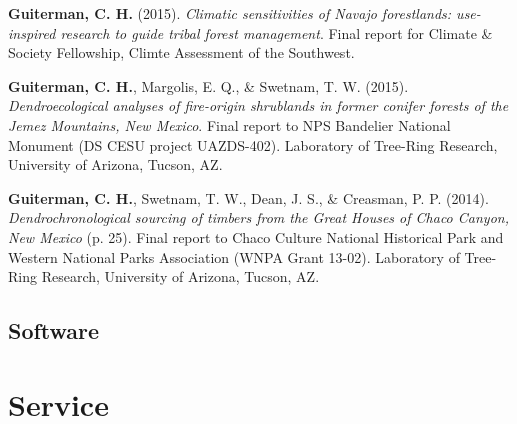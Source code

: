 \documentclass[11pt,a4paper,]{moderncv}
\begin{document}
\leavevmode\hypertarget{ref-NavajoClimateSensitivity}{}%
\textbf{Guiterman, C. H.} (2015). \emph{Climatic sensitivities of Navajo
forestlands: use-inspired research to guide tribal forest management}.
Final report for Climate \& Society Fellowship, Climte Assessment of the
Southwest.

\leavevmode\hypertarget{ref-Shrubfields}{}%
\textbf{Guiterman, C. H.}, Margolis, E. Q., \& Swetnam, T. W. (2015).
\emph{Dendroecological analyses of fire-origin shrublands in former
conifer forests of the Jemez Mountains, New Mexico}. Final report to NPS
Bandelier National Monument (DS CESU project UAZDS-402). Laboratory of
Tree-Ring Research, University of Arizona, Tucson, AZ.

\leavevmode\hypertarget{ref-ChacoReport}{}%
\textbf{Guiterman, C. H.}, Swetnam, T. W., Dean, J. S., \& Creasman, P.
P. (2014). \emph{Dendrochronological sourcing of timbers from the Great
Houses of Chaco Canyon, New Mexico} (p. 25). Final report to Chaco
Culture National Historical Park and Western National Parks Association
(WNPA Grant 13-02). Laboratory of Tree-Ring Research, University of
Arizona, Tucson, AZ.

\endgroup

\vspace{12pt}

\hypertarget{software}{%
\subsection{Software}\label{software}}

\nopagebreak

\hypertarget{service}{%
\section{Service}\label{service}}
\end{document}
